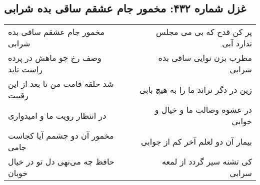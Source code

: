 \begin{center}
\section*{غزل شماره ۴۳۲: مخمور جام عشقم ساقی بده شرابی}
\label{sec:sh432}
\begin{longtable}{l p{0.5cm} r}
مخمور جام عشقم ساقی بده شرابی
&&
پر کن قدح که بی می مجلس ندارد آبی
\\
وصف رخ چو ماهش در پرده راست ناید
&&
مطرب بزن نوایی ساقی بده شرابی
\\
شد حلقه قامت من تا بعد از این رقیبت
&&
زین در دگر نراند ما را به هیچ بابی
\\
در انتظار رویت ما و امیدواری
&&
در عشوه وصالت ما و خیال و خوابی
\\
مخمور آن دو چشمم آیا کجاست جامی
&&
بیمار آن دو لعلم آخر کم از جوابی
\\
حافظ چه می‌نهی دل تو در خیال خوبان
&&
کی تشنه سیر گردد از لمعه سرابی
\\
\end{longtable}
\end{center}
